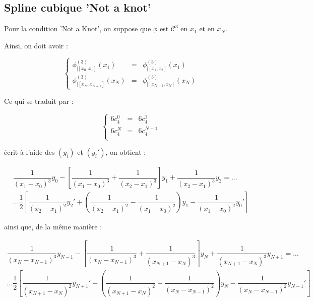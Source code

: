 \subsection{Spline cubique 'Not a knot'}

Pour la condition 'Not a Knot', on suppose que $\phi$ est $\mathcal{C}^3$ en $x_1$ et en $x_N$.

Ainsi, on doit avoir :

\begin{equation}
\left\lbrace
\begin{array}{rcl}
\phi_{|[x_0, x_1]}^{(3)}(x_1) & = & \phi_{|[x_1, x_2]}^{(3)}(x_1) \\
\phi_{|[x_N, x_{N+1}]}^{(3)}(x_N) & = & \phi_{|[x_{N-1}, x_N]}^{(3)}(x_N)
\end{array}
\right.
\label{NOK_condition}
\end{equation}

Ce qui se traduit par :

\begin{equation}
\left\lbrace
\begin{array}{rcl}
6 c_4^0 & = & 6 c_4^1 \\
6 c_4^{N} & = & 6 c_4^{N+1} \\
\end{array}
\right.
\end{equation}

écrit à l'aide des $(y_i)$ et $(y_i')$, on obtient :

\begin{multline}
\dfrac{1}{(x_1-x_0)^3} y_0 - \left[ \dfrac{1}{(x_1 - x_0)^3} + \dfrac{1}{(x_2-x_1)^3} \right] y_1 + \dfrac{1}{(x_2 - x_1)^3} y_2 = ... \\
... \dfrac{1}{2} \left[ \dfrac{1}{(x_2-x_1)^2} y_2' + \left( \dfrac{1}{(x_2-x_1)^2} - \dfrac{1}{(x_1-x_0)^2} \right) y_1 - \dfrac{1}{(x_1 - x_0)^2} y_0' \right]
\end{multline}

ainsi que, de la même manière :

\begin{multline}
\dfrac{1}{(x_N-x_{N-1})^3} y_{N-1} - \left[ \dfrac{1}{(x_N - x_{N-1})^3} + \dfrac{1}{(x_{N+1}-x_N)^3} \right] y_N + \dfrac{1}{(x_{N+1} - x_N)^3} y_{N+1} = ... \\
... \dfrac{1}{2} \left[ \dfrac{1}{(x_{N+1}-x_N)^2} y_{N+1}' + \left( \dfrac{1}{(x_{N+1}-x_N)^2} - \dfrac{1}{(x_N-x_{N-1})^2} \right) y_N - \dfrac{1}{(x_N - x_{N-1})^2} y_{N-1}' \right]
\end{multline}
















